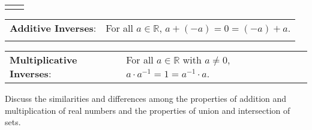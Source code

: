 \begin{enumerate}
\begin{flushleft}
\begin{tabular}{p{1.6in} p{2.65in}}
                 &  \\
\end{tabular}
\begin{tabular}{p{1.6in} p{2.65in}}
\textbf{Additive Inverses}:
\index{additive inverse}%
  &  For all  $a \in \mathbb{R}$, $a + ( - a) = 0 = ( - a) + a$.  \\
                 &  \\
\end{tabular}
\begin{tabular}{p{1.55in} p{2.65in}}
\textbf{Multiplicative Inverses}:
\index{multiplicative inverse}%
  &  For all  $a \in \mathbb{R}$ with  $a \ne 0$, $a \cdot a^{ - 1}  = 1 = a^{ - 1}  \cdot a$.\\
\end{tabular}
\end{flushleft}

Discuss the similarities and differences among the properties of addition and multiplication of real numbers and the properties of union and intersection of sets.
\end{enumerate}

\hbreak
\endinput
